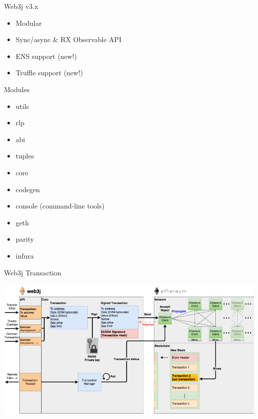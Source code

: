 \documentclass{beamer}
\begin{document}
\begin{frame}{Web3j v3.x}
	\begin{itemize}
		\item {
			Modular
		}
		\item {
			Sync/async \& RX Observable API
		}
		\item {
			ENS support (new!)
		}
		\item {
			Truffle support (new!)
		}
	\end{itemize}
\end{frame}

\begin{frame}{Modules}
	\begin{multicols}{2}
		\begin{itemize}
			\item {
				utils
			}
			\item {
				rlp
			}
			\item {
				abi
			}
			\item {
				tuples
			}	
			\item {
				core
			}
			\item {
				codegen
			}
			\item {
				console (command-line tools)
			}
			\item {
				geth
			}
			\item {
				parity
			}
			\item {
				infura
			}
		\end{itemize}
	\end{multicols}
\end{frame}

\begin{frame}{Web3j Transaction}
	\begin{center}
		\includegraphics[width=1\linewidth]{web3j-graph}
	\end{center}
\end{frame}
\end{document}
